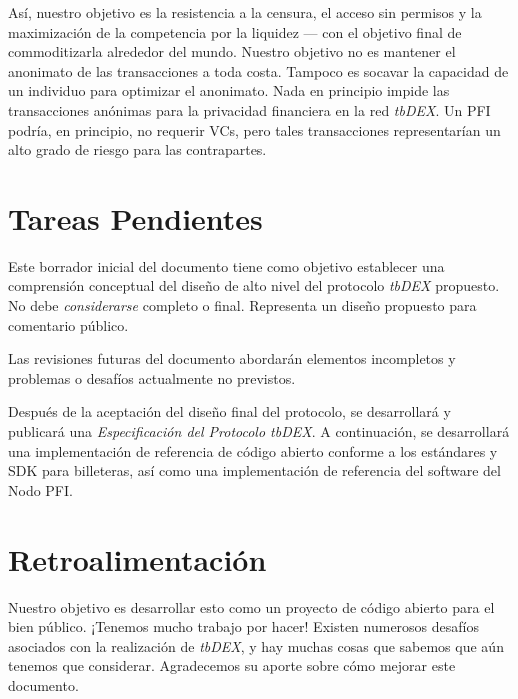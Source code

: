 \documentclass[11pt]{article}
\begin{document}
\vspace{1\baselineskip}
Así, nuestro objetivo es la resistencia a la censura, el acceso sin permisos y la maximización de la competencia por la liquidez \textcolor[HTML]{202124}{— }con el objetivo final de commoditizarla alrededor del mundo. Nuestro objetivo no es mantener el anonimato de las transacciones a toda costa. Tampoco es socavar la capacidad de un individuo para optimizar el anonimato. Nada en principio impide las transacciones anónimas para la privacidad financiera en la red \textit{tbDEX}. Un PFI podría, en principio, no requerir VCs, pero tales transacciones representarían un alto grado de riesgo para las contrapartes.

\vspace{1\baselineskip}
\section{Tareas Pendientes}

\vspace{1\baselineskip}
Este borrador inicial del documento tiene como objetivo establecer una comprensión conceptual del diseño de alto nivel del protocolo \textit{tbDEX} propuesto. No debe \textit{considerarse} completo o final. Representa un diseño propuesto para comentario público.

\vspace{1\baselineskip}
Las revisiones futuras del documento abordarán elementos incompletos y problemas o desafíos actualmente no previstos.

\vspace{1\baselineskip}
Después de la aceptación del diseño final del protocolo, se desarrollará y publicará una \textit{Especificación del Protocolo tbDEX}. A continuación, se desarrollará una implementación de referencia de código abierto conforme a los estándares y SDK para billeteras, así como una implementación de referencia del software del Nodo PFI.

\vspace{1\baselineskip}
\section{Retroalimentación}

\vspace{1\baselineskip}
Nuestro objetivo es desarrollar esto como un proyecto de código abierto para el bien público. ¡Tenemos mucho trabajo por hacer! Existen numerosos desafíos asociados con la realización de \textit{tbDEX}, y hay muchas cosas que sabemos que aún tenemos que considerar. Agradecemos su aporte sobre cómo mejorar este documento.
\end{document}
